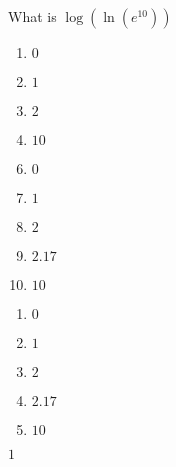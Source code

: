 

 What is $\log(\ln(e^{10}))$


\ifsat
	\begin{enumerate}[label=\Alph*)]
		\item    $0$
		\item   $1$%
		\item  $2$
		\item  $10$
	\end{enumerate}
\else
\fi

\ifacteven
	\begin{enumerate}[label=\textbf{\Alph*.},itemsep=\fill,align=left]
		\setcounter{enumii}{5}
		\item    $0$
		\item   $1$%
		\item  $2$
		\addtocounter{enumii}{1}
		\item $2.17$
		\item  $10$
	\end{enumerate}
\else
\fi

\ifactodd
	\begin{enumerate}[label=\textbf{\Alph*.},itemsep=\fill,align=left]
		\item    $0$
		\item   $1$%
		\item  $2$
		\item $2.17$
		\item  $10$
	\end{enumerate}
\else
\fi

\ifgridin
   $1$%
		
\else
\fi

